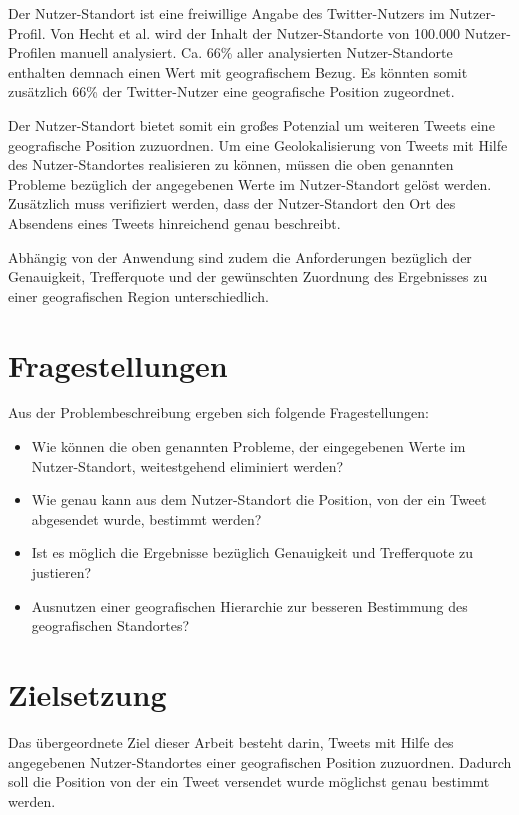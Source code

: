 		Der Nutzer-Standort ist eine freiwillige Angabe des Twitter-Nutzers im Nutzer-Profil. 
		Von Hecht et al. \cite{Hecht2011} wird der Inhalt der Nutzer-Standorte von 100.000 Nutzer-Profilen manuell analysiert.
	    Ca. 66\% aller analysierten Nutzer-Standorte enthalten demnach einen Wert mit geografischem Bezug.
	    Es könnten somit zusätzlich 66\% der Twitter-Nutzer eine geografische Position zugeordnet. 

	    Der Nutzer-Standort bietet somit ein großes Potenzial um weiteren Tweets eine geografische Position zuzuordnen.
	    Um eine Geolokalisierung von Tweets mit Hilfe des Nutzer-Standortes realisieren zu können, müssen die oben genannten Probleme bezüglich der angegebenen Werte im Nutzer-Standort gelöst werden.
	    Zusätzlich muss verifiziert werden, dass der Nutzer-Standort den Ort des Absendens eines Tweets hinreichend genau beschreibt.

	    Abhängig von der Anwendung sind zudem die Anforderungen bezüglich der Genauigkeit, Trefferquote und der gewünschten Zuordnung des Ergebnisses zu einer geografischen Region unterschiedlich. 

	    \newpage

	  \section{Fragestellungen}

	  	Aus der Problembeschreibung ergeben sich folgende Fragestellungen:  

	  	\begin{itemize}
	  		\item Wie können die oben genannten Probleme, der eingegebenen Werte im Nutzer-Standort, weitestgehend eliminiert werden?
	  		\item Wie genau kann aus dem Nutzer-Standort die Position, von der ein Tweet abgesendet wurde, bestimmt werden? 
			\item Ist es möglich die Ergebnisse bezüglich Genauigkeit und Trefferquote zu justieren?
			\item Ausnutzen einer geografischen Hierarchie zur besseren Bestimmung des geografischen Standortes? 
	  	\end{itemize}

	\section{Zielsetzung} 

		Das übergeordnete Ziel dieser Arbeit besteht darin, Tweets mit Hilfe des angegebenen Nutzer-Standortes einer geografischen Position zuzuordnen.
		Dadurch soll die Position von der ein Tweet versendet wurde möglichst genau bestimmt werden.

